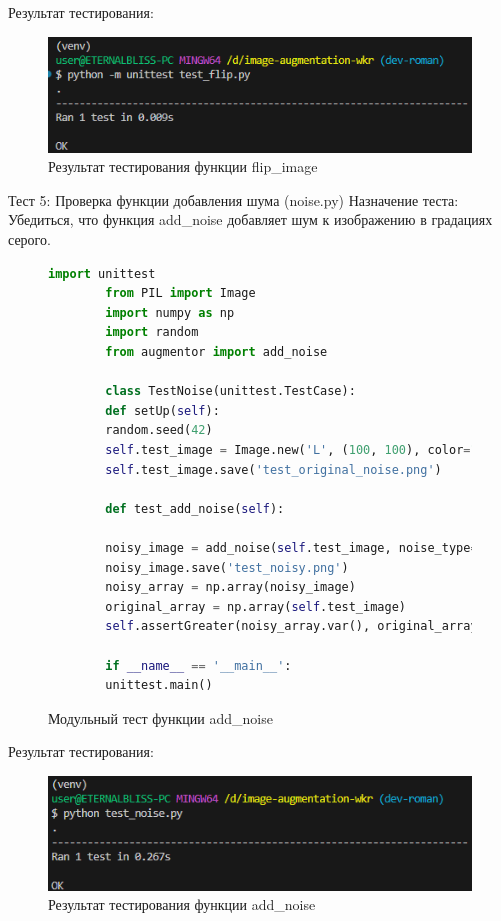Результат тестирования:
\begin{figure}[H]
	\centering
	\includegraphics[width=0.7\linewidth]{images/resulttest4}
	\caption{Результат тестирования функции flip\_image}
	\label{fig:resulttest4}
\end{figure}

Тест 5: Проверка функции добавления шума (noise.py)
Назначение теста: Убедиться, что функция add\_noise добавляет шум к изображению в градациях серого.

\begin{figure}[H]
	\begin{lstlisting}[language=Python]
		import unittest
		from PIL import Image
		import numpy as np
		import random
		from augmentor import add_noise
		
		class TestNoise(unittest.TestCase):
		def setUp(self):
		random.seed(42)
		self.test_image = Image.new('L', (100, 100), color=128)
		self.test_image.save('test_original_noise.png')
		
		def test_add_noise(self):
		
		noisy_image = add_noise(self.test_image, noise_type='gaussian', stddev=10)
		noisy_image.save('test_noisy.png')
		noisy_array = np.array(noisy_image)
		original_array = np.array(self.test_image)
		self.assertGreater(noisy_array.var(), original_array.var(), "Дисперсия не увеличилась после добавления шума.")
		
		if __name__ == '__main__':
		unittest.main()
	\end{lstlisting}  
	\caption{Модульный тест функции add\_noise}
	\label{model_test:test5}
\end{figure}

Результат тестирования:
\begin{figure}[H]
	\centering
	\includegraphics[width=0.7\linewidth]{images/resulttest5}
	\caption{Результат тестирования функции add\_noise}
	\label{fig:resulttest5}
\end{figure}

